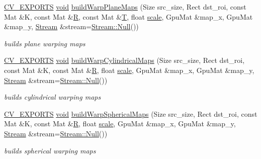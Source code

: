 \begin{DoxyCompactItemize}
\item 
\hyperlink{core_2types__c_8h_a1bf9f0e121b54272da02379cfccd0a2b}{C\-V\-\_\-\-E\-X\-P\-O\-R\-T\-S} \hyperlink{legacy_8hpp_a8bb47f092d473522721002c86c13b94e}{void} \hyperlink{namespacecv_1_1gpu_ab9417fe8aa259dd95c640e28196de353}{build\-Warp\-Plane\-Maps} (Size src\-\_\-size, Rect dst\-\_\-roi, const Mat \&K, const Mat \&\hyperlink{imgproc__c_8h_a51837f120208319f026dc8c4a71e56e0}{R}, const Mat \&\hyperlink{calib3d_8hpp_a3efb9551a871ddd0463079a808916717}{T}, float \hyperlink{objdetect_8hpp_a1f622eb9b9e06b30862ca90cdf2c078b}{scale}, Gpu\-Mat \&map\-\_\-x, Gpu\-Mat \&map\-\_\-y, \hyperlink{classcv_1_1gpu_1_1Stream}{Stream} \&stream=\hyperlink{classcv_1_1gpu_1_1Stream_af96c23564834f88333dcb8997df553f1}{Stream\-::\-Null}())
\begin{DoxyCompactList}\small\item\em builds plane warping maps \end{DoxyCompactList}\item 
\hyperlink{core_2types__c_8h_a1bf9f0e121b54272da02379cfccd0a2b}{C\-V\-\_\-\-E\-X\-P\-O\-R\-T\-S} \hyperlink{legacy_8hpp_a8bb47f092d473522721002c86c13b94e}{void} \hyperlink{namespacecv_1_1gpu_a1fcc8d1c094833058e95122dc4670669}{build\-Warp\-Cylindrical\-Maps} (Size src\-\_\-size, Rect dst\-\_\-roi, const Mat \&K, const Mat \&\hyperlink{imgproc__c_8h_a51837f120208319f026dc8c4a71e56e0}{R}, float \hyperlink{objdetect_8hpp_a1f622eb9b9e06b30862ca90cdf2c078b}{scale}, Gpu\-Mat \&map\-\_\-x, Gpu\-Mat \&map\-\_\-y, \hyperlink{classcv_1_1gpu_1_1Stream}{Stream} \&stream=\hyperlink{classcv_1_1gpu_1_1Stream_af96c23564834f88333dcb8997df553f1}{Stream\-::\-Null}())
\begin{DoxyCompactList}\small\item\em builds cylindrical warping maps \end{DoxyCompactList}\item 
\hyperlink{core_2types__c_8h_a1bf9f0e121b54272da02379cfccd0a2b}{C\-V\-\_\-\-E\-X\-P\-O\-R\-T\-S} \hyperlink{legacy_8hpp_a8bb47f092d473522721002c86c13b94e}{void} \hyperlink{namespacecv_1_1gpu_a1eddcfde971cec61b4a06153607c670f}{build\-Warp\-Spherical\-Maps} (Size src\-\_\-size, Rect dst\-\_\-roi, const Mat \&K, const Mat \&\hyperlink{imgproc__c_8h_a51837f120208319f026dc8c4a71e56e0}{R}, float \hyperlink{objdetect_8hpp_a1f622eb9b9e06b30862ca90cdf2c078b}{scale}, Gpu\-Mat \&map\-\_\-x, Gpu\-Mat \&map\-\_\-y, \hyperlink{classcv_1_1gpu_1_1Stream}{Stream} \&stream=\hyperlink{classcv_1_1gpu_1_1Stream_af96c23564834f88333dcb8997df553f1}{Stream\-::\-Null}())
\begin{DoxyCompactList}\small\item\em builds spherical warping maps \end{DoxyCompactList}\item 

\end{DoxyCompactItemize}
